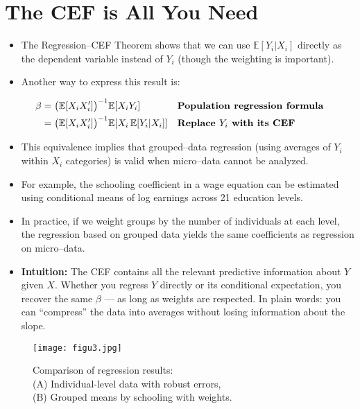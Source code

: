 \documentclass[12pt]{article}
\begin{document}
\section*{\noindent\textbf{The CEF is All You Need}}

\begin{itemize}
    \item The Regression–CEF Theorem shows that we can use $\mathbb{E}[Y_i|X_i]$ directly as the dependent variable instead of $Y_i$ (though the weighting is important).
    \item Another way to express this result is:
\end{itemize}

\singlespacing
\begin{align}
\beta &= \big(\mathbb{E}[X_i X_i']\big)^{-1} \mathbb{E}[X_i Y_i] && \text{\textbf{Population regression formula}} \\
      &= \big(\mathbb{E}[X_i X_i']\big)^{-1} \mathbb{E}[X_i \,\mathbb{E}[Y_i|X_i]] && \text{\textbf{Replace $Y_i$ with its CEF}}
\end{align}

\begin{itemize}
    \item This equivalence implies that grouped–data regression (using averages of $Y_i$ within $X_i$ categories) is valid when micro–data cannot be analyzed.
    \item For example, the schooling coefficient in a wage equation can be estimated using conditional means of log earnings across 21 education levels.
    \item In practice, if we weight groups by the number of individuals at each level, the regression based on grouped data yields the same coefficients as regression on micro–data.
    \item \textbf{Intuition:} The CEF contains all the relevant predictive information about $Y$ given $X$. Whether you regress $Y$ directly or its conditional expectation, you recover the same $\beta$ — as long as weights are respected. In plain words: you can “compress” the data into averages without losing information about the slope.
\end{itemize}

\begin{figure}[H]
    \centering
    \texttt{[image: figu3.jpg]} %
    \caption*{Comparison of regression results: \\
    (A) Individual-level data with robust errors, \\
    (B) Grouped means by schooling with weights.}
\end{figure}
\end{document}
